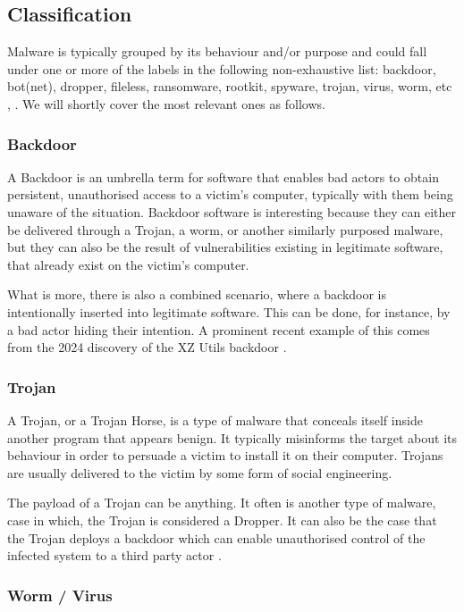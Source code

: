 \subsection{Classification}

Malware is typically grouped by its behaviour and/or purpose and could fall under one or more of the labels in the following non-exhaustive list: backdoor, bot(net), dropper, fileless, ransomware, rootkit, spyware, trojan, virus, worm, etc \cite{wiki_malware}, \cite{zeusvm}. We will shortly cover the most relevant ones as follows.

\subsubsection{Backdoor}

A Backdoor is an umbrella term for software that enables bad actors to obtain persistent, unauthorised access to a victim's computer, typically with them being unaware of the situation. Backdoor software is  interesting because they can either be delivered through a Trojan, a worm, or another similarly purposed malware, but they can also be the result of vulnerabilities existing in legitimate software, that already exist on the victim's computer. 

What is more, there is also a combined scenario, where a backdoor is intentionally inserted into legitimate software. This can be done, for instance, by a bad actor hiding their intention. A prominent recent example of this comes from the 2024 discovery of the XZ Utils backdoor \cite{xz_backdoor}.

\subsubsection{Trojan}

A Trojan, or a Trojan Horse, is a type of malware that conceals itself inside another program that appears benign. It typically misinforms the target about its behaviour in order to persuade a victim to install it on their computer. Trojans are usually delivered to the victim by some form of social engineering. 

The payload of a Trojan can be anything. It often is another type of malware, case in which, the Trojan is considered a Dropper. It can also be the case that the Trojan deploys a backdoor which can enable unauthorised control of the infected system to a third party actor \cite{wiki_malware}.

\subsubsection{Worm / Virus}

